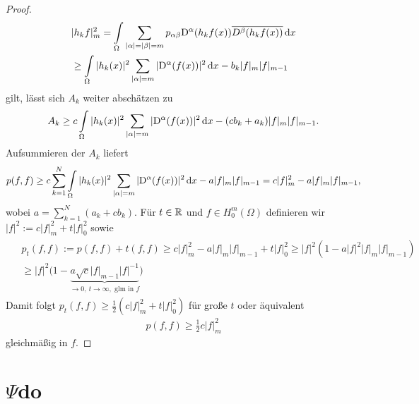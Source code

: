 \begin{proof}
\begin{align}
\begin{split}
	&\vert h_kf\vert_m^2 = \int\limits_\Omega \sum\limits_{\vert\alpha\vert=\vert\beta\vert=m}p_{\alpha\beta}\mathrm D^\alpha(h_kf(x))\overline{D^\beta(h_kf(x))}\,\mathrm d x \\
	&\ge \int\limits_\Omega \vert h_k(x)\vert^2 \sum\limits_{\vert\alpha\vert=m}\vert \mathrm D^\alpha (f(x))\vert^2 \,\mathrm d x-b_k \vert f\vert_m\vert f\vert_{m-1}
	\end{split}
\end{align}
gilt, lässt sich $A_k$ weiter abschätzen zu
\begin{align}
	A_k \ge c\int\limits_\Omega \vert h_k(x)\vert^2 \sum\limits_{\vert\alpha\vert=m}\vert \mathrm D^\alpha (f(x))\vert^2 \,\mathrm d x-(cb_k+a_k)\vert f\vert_m\vert f\vert_{m-1}.
\end{align}
Aufsummieren der $A_k$ liefert
\begin{align}
	p(f,f) \ge c \sum\limits_{k=1}^N \int\limits_\Omega\vert h_k(x)\vert^2  \sum\limits_{\vert\alpha\vert=m}\vert \mathrm D^\alpha (f(x))\vert^2 \,\mathrm d x-a\vert f\vert_m\vert f\vert_{m-1} =c\vert f\vert_m^2 -a \vert f\vert_m\vert f\vert_{m-1},
\end{align}
wobei $a= \sum_{k=1}^N (a_k+cb_k)$. Für $t\in \mathbb R$ und $f\in H_0^m(\Omega)$ definieren wir $\vert f\vert^2:= c \vert f\vert_m^2+t\vert f\vert_0^2$ sowie
\begin{align}
\begin{split}
	&p_t(f,f) := p(f,f)+t(f,f) \ge c\vert f\vert_m^2-a\vert f\vert_m\vert f\vert_{m-1}+t\vert f\vert_0^2 \ge \vert f\vert^2\left(1-a\vert f\vert^2\vert f\vert_m\vert f\vert_{m-1}\right)\\
	& \ge \vert f\vert^2\big(1-\underbrace{a \sqrt{c}\vert f\vert_{m-1}\vert f\vert^{-1}}_{\rightarrow 0, \ t \rightarrow \infty, \text{ glm in } f}\big)
	\end{split}
\end{align}
Damit folgt $p_t(f,f) \ge \frac{1}{2}\left(c\vert f\vert_m^2+t\vert f\vert_0^2\right)$ für große $t$ oder äquivalent
\begin{align}
	p(f,f) \ge \frac{1}{2}c\vert f\vert_m^2
\end{align}
gleichmäßig in $f$. 
\end{proof}


\section{$\Psi$do}



